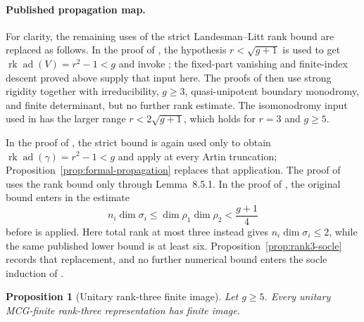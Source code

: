 \documentclass[11pt]{article}
\newtheorem{proposition}[theorem]{Proposition}
\theoremstyle{definition}
\newcommand{\rk}{\operatorname{rk}}
\newcommand{\ad}{\operatorname{ad}}
\begin{document}
\paragraph{Published propagation map.}
For clarity, the remaining uses of the strict Landesman--Litt rank bound are
replaced as follows.  In the proof of
\cite[Proposition 8.2.1]{LLCan}, the hypothesis $r<\sqrt{g+1}$ is used to get
$\rk\ad(V)=r^2-1<g$ and invoke \cite[Theorem 6.2.1]{LLCan}; the fixed-part
vanishing and finite-index descent proved above supply that input here.  The
proofs of \cite[Lemmas 8.3.3 and 8.3.4]{LLCan} then use strong rigidity
together with irreducibility, $g\ge3$, quasi-unipotent boundary monodromy,
and finite determinant, but no further rank estimate.  The isomonodromy input
used in \cite[Proposition 8.4.1]{LLCan} has the larger range
$r<2\sqrt{g+1}$, which holds for $r=3$ and $g\ge5$.

In the proof of \cite[Lemma 8.5.1]{LLCan}, the strict bound is again used only
to obtain $\rk\ad(\gamma)=r^2-1<g$ and apply
\cite[Theorem 6.2.1]{LLCan} at every Artin truncation;
Proposition~\ref{prop:formal-propagation} replaces that application.  The
proof of \cite[Lemma 8.5.2]{LLCan} uses the rank bound only through
Lemma~8.5.1.  In the proof of \cite[Lemma 8.6.1]{LLCan}, the original bound
enters in the estimate
\[
 n_i\dim\sigma_i\le \dim\rho_1\dim\rho_2<\frac{g+1}{4}
\]
before \cite[Theorem 7.2.1]{LLCan} is applied.  Here total rank at most three
instead gives $n_i\dim\sigma_i\le2$, while the same published lower bound is
at least six.  Proposition~\ref{prop:rank3-socle} records that replacement,
and no further numerical bound enters the socle induction of
\cite[Section 8.7]{LLCan}.

\begin{proposition}[Unitary rank-three finite image]
\label{prop:unitary-rank3}
Let $g\ge5$.  Every unitary MCG-finite rank-three representation has finite
image.
\end{proposition}
\end{document}
